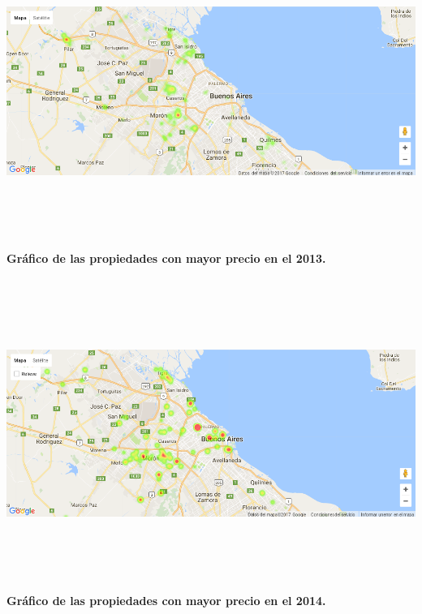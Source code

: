 \documentclass[a4paper, 10pt]{article}
\begin{document}
        \begin{center}
              \includegraphics[width=7in, height=4in]{images/ubicP2013}
              \textbf{Gráfico de las propiedades con mayor precio en el 2013.}
        \end{center}
        \begin{center}
              \includegraphics[width=7in, height=4in]{images/ubicP2014}
              \textbf{Gráfico de las propiedades con mayor precio en el 2014.}
        \end{center}
\end{document}
